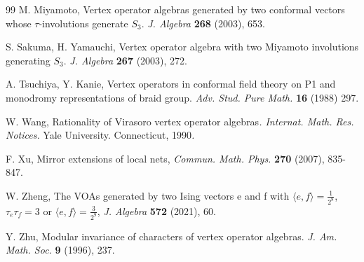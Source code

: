\documentclass{article}
\begin{document}
\begin{thebibliography}{99}
 M. Miyamoto, Vertex operator algebras generated by
two conformal vectors whose $\tau$-involutions generate $S_3$.
\emph{J. Algebra }\textbf{268 }(2003), 653.




 S. Sakuma, H. Yamauchi, Vertex operator algebra
with two Miyamoto involutions generating $S_{3}$. \emph{J. Algebra
}\textbf{267 }(2003), 272.

 A. Tsuchiya, Y. Kanie, Vertex operators in conformal
field theory on P1 and monodromy representations of braid group. \emph{Adv.
Stud. Pure Math.} \textbf{16} (1988) 297.

 W. Wang, Rationality of Virasoro vertex operator algebras\emph{.
Internat. Math. Res. Notices. }Yale University. Connecticut, 1990\emph{. }

 F. Xu, Mirror extensions of local nets, {\em Commun. Math. Phys.} {\bf 270} (2007), 835-847.

 W. Zheng,
The VOAs generated by two Ising vectors e and f with $\langle e,f\rangle=\frac{1}{2^8}$,
$\tau_e\tau_f=3$ or $\langle e,f\rangle=\frac{3}{2^9}$, \emph{J. Algebra} \textbf{572} (2021),
60.

 Y. Zhu, Modular invariance of characters of vertex
operator algebras. \emph{J. Am. Math. Soc.} \textbf{9} (1996), 237.



\end{thebibliography}
\end{document}

